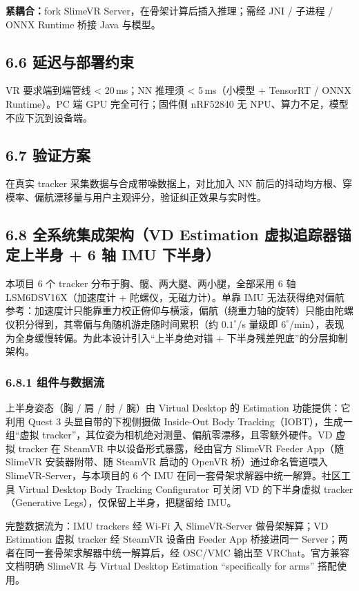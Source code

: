\documentclass[UTF8,11pt,a4paper]{ctexart}
\begin{document}
\textbf{紧耦合：}fork SlimeVR Server，在骨架计算后插入推理；需经 JNI / 子进程 / ONNX Runtime 桥接 Java 与模型。

\subsection{6.6 延迟与部署约束}
VR 要求端到端管线 < 20\,ms；NN 推理须 < 5\,ms（小模型 + TensorRT / ONNX Runtime）。PC 端 GPU 完全可行；固件侧 nRF52840 无 NPU、算力不足，模型不应下沉到设备端。

\subsection{6.7 验证方案}
在真实 tracker 采集数据与合成带噪数据上，对比加入 NN 前后的抖动均方根、穿模率、偏航漂移量与用户主观评分，验证纠正效果与实时性。

\subsection{6.8 全系统集成架构（VD Estimation 虚拟追踪器锚定上半身 + 6 轴 IMU 下半身）}
本项目 6 个 tracker 分布于胸、髋、两大腿、两小腿，全部采用 6 轴 LSM6DSV16X（加速度计 + 陀螺仪，无磁力计）。单靠 IMU 无法获得绝对偏航参考：加速度计只能靠重力校正俯仰与横滚，偏航（绕重力轴的旋转）只能由陀螺仪积分得到，其零偏与角随机游走随时间累积（约 $0.1^{\circ}$/s 量级即 $6^{\circ}$/min），表现为全身缓慢转偏。为此本设计引入“上半身绝对锚 + 下半身残差兜底”的分层抑制架构。

\subsubsection{6.8.1 组件与数据流}
上半身姿态（胸 / 肩 / 肘 / 腕）由 Virtual Desktop 的 Estimation 功能提供：它利用 Quest 3 头显自带的下视侧摄做 Inside-Out Body Tracking（IOBT），生成一组“虚拟 tracker”，其位姿为相机绝对测量、偏航零漂移，且零额外硬件。VD 虚拟 tracker 在 SteamVR 中以设备形式暴露，经由官方 SlimeVR Feeder App（随 SlimeVR 安装器附带、随 SteamVR 启动的 OpenVR 桥）通过命名管道喂入 SlimeVR-Server，与本项目的 6 个 IMU 在同一套骨架求解器中统一解算。社区工具 Virtual Desktop Body Tracking Configurator 可关闭 VD 的下半身虚拟 tracker（Generative Legs），仅保留上半身，把腿留给 IMU。

完整数据流为：IMU trackers 经 Wi-Fi 入 SlimeVR-Server 做骨架解算；VD Estimation 虚拟 tracker 经 SteamVR 设备由 Feeder App 桥接进同一 Server；两者在同一套骨架求解器中统一解算后，经 OSC/VMC 输出至 VRChat。官方兼容文档明确 SlimeVR 与 Virtual Desktop Estimation “specifically for arms” 搭配使用。
\end{document}
